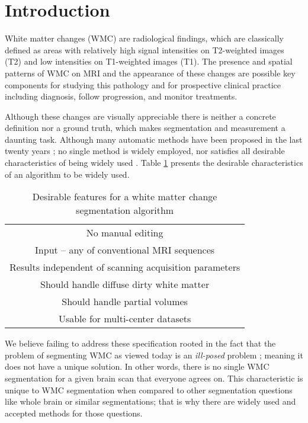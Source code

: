 \section{Introduction} \label{intro}


White matter changes (WMC) are radiological findings, which are classically defined as areas with relatively high signal intensities on T2-weighted images (T2) and low intensities on T1-weighted images (T1). The presence and spatial patterns of WMC on MRI and the appearance of these changes are possible key components for studying this pathology and for prospective clinical practice including diagnosis, follow progression, and monitor treatments.

Although these changes are visually appreciable there is neither a concrete definition nor a ground truth, which makes segmentation and measurement a daunting task. Although many automatic methods have been proposed in the last twenty years \cite{Kamber_1995,Udupa_1997,Boudraa2000,Zijdenbos_2002,LesionTOADS_2010,OutlierLocalIntensity_2011,CascadeOrig,LesionSegmentationToolbox_2012,kNN-TTPs_2013,Rotation-invariant_2015}; no single method is widely employed, nor satisfies all desirable characteristics of being widely used \cite{GarciaReview}. Table \ref{Table:Requirements} presents the desirable characteristics of an algorithm to be widely used.

\begin{table}
\centering
    \begin{tabular}  {  c }
    \hline
        No manual editing \\ 
        Input – any of conventional MRI sequences \\ 
        Results independent of scanning acquisition parameters \\ 
        Should handle diffuse dirty white matter \\ 
        Should handle partial volumes \\ 
        Usable for multi-center datasets \\
    \hline
    \end{tabular} 
    \caption{Desirable features for a white matter change segmentation algorithm } 
    \label{Table:Requirements}
\end{table}
    


We believe failing to address these specification rooted in the fact that the problem of segmenting WMC as viewed today is an \textit{ill-posed} problem \cite{IllPosed}; meaning it does not have a unique solution. In other words, there is no single WMC segmentation for a given brain scan that everyone agrees on. This characteristic is unique to WMC segmentation when compared to other segmentation questions like whole brain or similar segmentations; that is why there are widely used and accepted methods for those questions.

